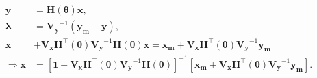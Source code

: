 \documentclass[aps, prb, onecolumn, floatfix, amssymb, superscriptaddress, nofootinbib, longbibliography]{revtex4-2}
\begin{document}
\begin{align}
\mathbf{y} &= \mathbf{H}(\boldsymbol{\theta})\mathbf{x},\\
\boldsymbol{\lambda} &= \mathbf{V_{y}}^{-1}(\mathbf{y_{m}} - \mathbf{y}),\\
\mathbf{x} &+ \mathbf{V_{x}}\mathbf{H}^\intercal(\boldsymbol{\theta})\mathbf{V_{y}}^{-1}\mathbf{H}(\boldsymbol{\theta})\mathbf{x} = \mathbf{x_{m}} + \mathbf{V_{x}}\mathbf{H}^\intercal(\boldsymbol{\theta})\mathbf{V_{y}}^{-1}\mathbf{y_{m}}\\
\Rightarrow \mathbf{x} &= \left[\mathbf{1} + \mathbf{V_{x}}\mathbf{H}^\intercal(\boldsymbol{\theta})\mathbf{V_{y}}^{-1}\mathbf{H}(\boldsymbol{\theta})\right]^{-1}\left[\mathbf{x_{m}} + \mathbf{V_{x}}\mathbf{H}^\intercal(\boldsymbol{\theta})\mathbf{V_{y}}^{-1}\mathbf{y_{m}}\right].
\end{align}
\end{document}
